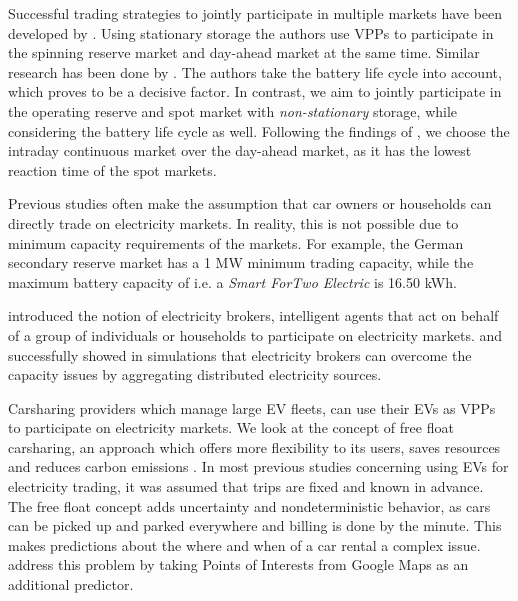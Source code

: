 \documentclass[12pt, article]{article}
\begin{document}
Successful trading strategies to jointly participate in multiple markets have
been developed by \textcite{mashhour11_biddin_strat_virtual_power_plant_2}. Using
stationary storage the authors use VPPs to participate in the spinning reserve
market and day-ahead market at the same time. Similar research has been done by
\textcite{he16_optim_biddin_strat_batter_storag}. The authors take the battery
life cycle into account, which proves to be a decisive factor. In contrast, we
aim to jointly participate in the operating reserve and spot market with
\emph{non-stationary} storage, while considering the battery life cycle as well.
Following the findings of
\textcite{tomic07_using_fleet_elect_drive_vehic_grid_suppor}, we choose the
intraday continuous market over the day-ahead market, as it has the lowest
reaction time of the spot markets.


Previous studies often make the assumption that car owners or households can
directly trade on electricity markets. In reality, this is not possible due to
minimum capacity requirements of the markets. For example, the German secondary
reserve market has a 1 MW minimum trading capacity, while the maximum battery
capacity of i.e. a \emph{Smart ForTwo Electric} is 16.50 kWh.

\textcite{ketter13_power_tac} introduced the notion of electricity brokers,
intelligent agents that act on behalf of a group of individuals or households to
participate on electricity markets.
\textcite{brandt17_evaluat_busin_model_vehic_grid_integ} and
\textcite{kahlen14_balan_with_elect_vehic} successfully showed in simulations that
electricity brokers can overcome the capacity issues by aggregating distributed
electricity sources.

Carsharing providers which manage large EV fleets, can use their EVs as VPPs to
participate on electricity markets. We look at the concept of free float
carsharing, an approach which offers more flexibility to its users, saves
resources and reduces carbon emissions
\parencite{firnkorn15_free_float_elect_carsh_fleet_smart_cities}. In most previous
studies concerning using EVs for electricity trading, it was assumed that trips
are fixed and known in advance. The free float concept adds uncertainty and
nondeterministic behavior, as cars can be picked up and parked everywhere and
billing is done by the minute. This makes predictions about the where and when
of a car rental a complex issue. \textcite{wagner16_in_free_float} address this
problem by taking Points of Interests from Google Maps as an additional
predictor.
\end{document}
